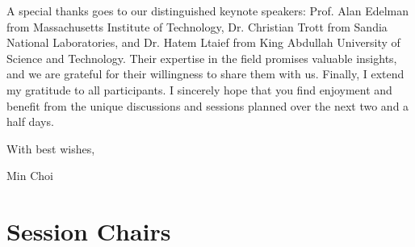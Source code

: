 \documentclass[12pt,letterpaper]{book}
\newenvironment{conf-abstract}[4][]{
 \needspace{10\baselineskip}
 \begin{center}
 { \renewcommand\textsuperscript[1]{}
 \phantomsection\addcontentsline{toc}{section}
 {\texorpdfstring{#2 (\emph{#3})}{#2 (#3)}}
 }
 {{\large\bfseries #2}\marginnote{#1}\par}
 \medskip
 {#3\par}
 \smallskip
 {\small #4\par}
 \end{center}
}{%
 \bigskip
 \hrule
 \bigskip
}
\begin{document}
\vspace{1ex}

\noindent A special thanks goes to our distinguished keynote speakers: Prof. Alan Edelman
from Massachusetts Institute of Technology, Dr. Christian Trott from Sandia National Laboratories,
and Dr. Hatem Ltaief from King Abdullah University of Science and Technology. 
Their expertise in the field promises valuable insights, and we are
grateful for their willingness to share them with us. Finally, I extend
my gratitude to all participants. I sincerely hope that you find
enjoyment and benefit from the unique discussions and sessions planned
over the next two and a half days.

\vspace{1ex}

\noindent With best wishes,

\noindent Min Choi


%




\tableofcontents

\mainmatter



\chapter{Session Chairs}
\end{document}
